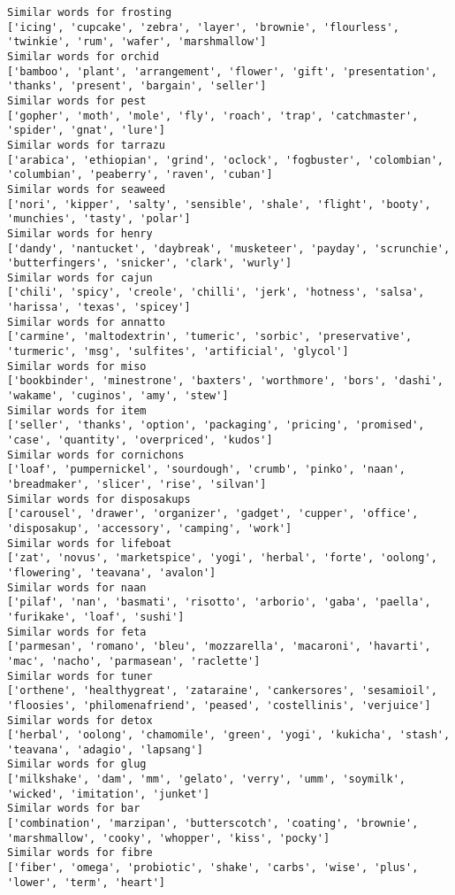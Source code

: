 \documentclass[11pt]{article}
\begin{document}
\begin{Verbatim}[commandchars=\\\{\}]
Similar words for frosting
['icing', 'cupcake', 'zebra', 'layer', 'brownie', 'flourless', 'twinkie', 'rum', 'wafer', 'marshmallow']
Similar words for orchid
['bamboo', 'plant', 'arrangement', 'flower', 'gift', 'presentation', 'thanks', 'present', 'bargain', 'seller']
Similar words for pest
['gopher', 'moth', 'mole', 'fly', 'roach', 'trap', 'catchmaster', 'spider', 'gnat', 'lure']
Similar words for tarrazu
['arabica', 'ethiopian', 'grind', 'oclock', 'fogbuster', 'colombian', 'columbian', 'peaberry', 'raven', 'cuban']
Similar words for seaweed
['nori', 'kipper', 'salty', 'sensible', 'shale', 'flight', 'booty', 'munchies', 'tasty', 'polar']
Similar words for henry
['dandy', 'nantucket', 'daybreak', 'musketeer', 'payday', 'scrunchie', 'butterfingers', 'snicker', 'clark', 'wurly']
Similar words for cajun
['chili', 'spicy', 'creole', 'chilli', 'jerk', 'hotness', 'salsa', 'harissa', 'texas', 'spicey']
Similar words for annatto
['carmine', 'maltodextrin', 'tumeric', 'sorbic', 'preservative', 'turmeric', 'msg', 'sulfites', 'artificial', 'glycol']
Similar words for miso
['bookbinder', 'minestrone', 'baxters', 'worthmore', 'bors', 'dashi', 'wakame', 'cuginos', 'amy', 'stew']
Similar words for item
['seller', 'thanks', 'option', 'packaging', 'pricing', 'promised', 'case', 'quantity', 'overpriced', 'kudos']
Similar words for cornichons
['loaf', 'pumpernickel', 'sourdough', 'crumb', 'pinko', 'naan', 'breadmaker', 'slicer', 'rise', 'silvan']
Similar words for disposakups
['carousel', 'drawer', 'organizer', 'gadget', 'cupper', 'office', 'disposakup', 'accessory', 'camping', 'work']
Similar words for lifeboat
['zat', 'novus', 'marketspice', 'yogi', 'herbal', 'forte', 'oolong', 'flowering', 'teavana', 'avalon']
Similar words for naan
['pilaf', 'nan', 'basmati', 'risotto', 'arborio', 'gaba', 'paella', 'furikake', 'loaf', 'sushi']
Similar words for feta
['parmesan', 'romano', 'bleu', 'mozzarella', 'macaroni', 'havarti', 'mac', 'nacho', 'parmasean', 'raclette']
Similar words for tuner
['orthene', 'healthygreat', 'zataraine', 'cankersores', 'sesamioil', 'floosies', 'philomenafriend', 'peased', 'costellinis', 'verjuice']
Similar words for detox
['herbal', 'oolong', 'chamomile', 'green', 'yogi', 'kukicha', 'stash', 'teavana', 'adagio', 'lapsang']
Similar words for glug
['milkshake', 'dam', 'mm', 'gelato', 'verry', 'umm', 'soymilk', 'wicked', 'imitation', 'junket']
Similar words for bar
['combination', 'marzipan', 'butterscotch', 'coating', 'brownie', 'marshmallow', 'cooky', 'whopper', 'kiss', 'pocky']
Similar words for fibre
['fiber', 'omega', 'probiotic', 'shake', 'carbs', 'wise', 'plus', 'lower', 'term', 'heart']

\end{Verbatim}
\end{document}
